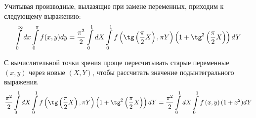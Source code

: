 \documentclass[12pt]{article}
\newcommand{\vverh}{\vspace*{-0.3cm}}
\begin{document}
Учитывая производные, вылазящие при замене переменных, приходим к следующему выражению:
\vverh
\begin{gather}
		\int\limits_{0}^{\infty} dx \int\limits_{0}^{\pi} f(x, y) dy = \frac{\pi^2}{2} \int\limits_0^1 d X \int\limits_0^1 f \left( \tg \left( \frac{\pi}{2} X \right), \pi Y \right) \left( 1 + \tg^2 \left( \frac{\pi}{2} X \right) \right) d Y \notag
\end{gather}

С вычислительной точки зрения проще пересчитывать старые переменные $\left( x, y \right)$ через новые $\left( X, Y \right)$, чтобы рассчитать значение подынтегрального выражения. 
\vverh
\begin{gather}
		\frac{\pi^2}{2} \int\limits_0^1 d X \int\limits_0^1 f \left( \tg \left( \frac{\pi}{2} X \right), \pi Y \right) \left( 1 + \tg^2 \left( \frac{\pi}{2} X \right) \right) d Y = \frac{\pi^2}{2} \int\limits_0^1 d X \int\limits_0^1 f \left( x, y \right) (1 + x^2 ) d Y \notag
\end{gather}
\end{document}
